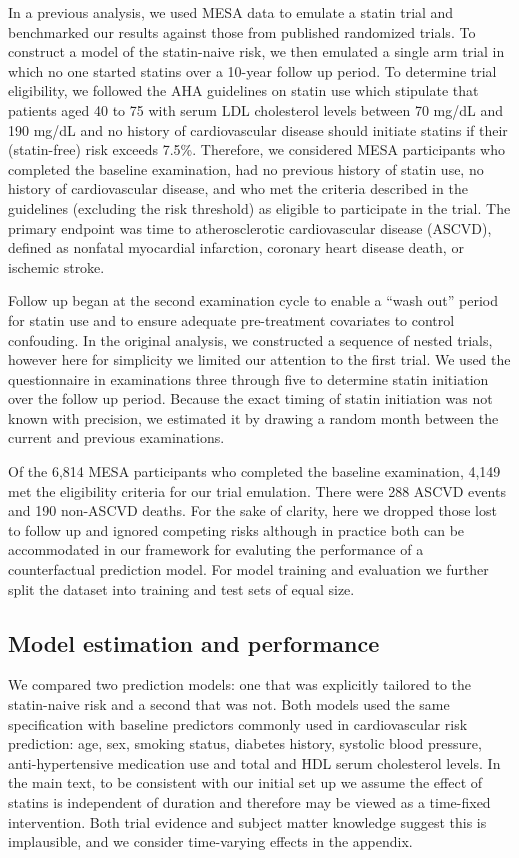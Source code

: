 In a previous analysis, we used MESA data to emulate a statin trial and benchmarked our results against those from published randomized trials. To construct a model of the statin-naive risk, we then emulated a single arm trial in which no one started statins over a 10-year follow up period. To determine trial eligibility, we followed the AHA guidelines \cite{grundy_scott_m_2018_2019} on statin use which stipulate that patients aged 40 to 75 with serum LDL cholesterol levels between 70 mg/dL and 190 mg/dL and no history of cardiovascular disease should initiate statins if their (statin-free) risk exceeds 7.5\%. Therefore, we considered MESA participants who completed the baseline examination, had no previous history of statin use, no history of cardiovascular disease, and who met the criteria described in the guidelines (excluding the risk threshold) as eligible to participate in the trial. The primary endpoint was time to atherosclerotic cardiovascular disease (ASCVD), defined as nonfatal myocardial infarction, coronary heart disease death, or ischemic stroke. 

Follow up began at the second examination cycle to enable a ``wash out'' period for statin use and to ensure adequate pre-treatment covariates to control confouding. In the original analysis, we constructed a sequence of nested trials, however here for simplicity we limited our attention to the first trial. We used the questionnaire in examinations three through five to determine statin initiation over the follow up period. Because the exact timing of statin initiation was not known with precision, we estimated it by drawing a random month between the current and previous examinations. 

Of the 6,814 MESA participants who completed the baseline examination, 4,149 met the eligibility criteria for our trial emulation. There were 288 ASCVD events and 190 non-ASCVD deaths. For the sake of clarity, here we dropped those lost to follow up and ignored competing risks although in practice both can be accommodated in our framework for evaluting the performance of a counterfactual prediction model. For model training and evaluation we further split the dataset into training and test sets of equal size. 

\subsection{Model estimation and performance}
We compared two prediction models: one that was explicitly tailored to the statin-naive risk and a second that was not. Both models used the same specification with baseline predictors commonly used in cardiovascular risk prediction: age, sex, smoking status, diabetes history, systolic blood pressure, anti-hypertensive medication use and total and HDL serum cholesterol levels. In the main text, to be consistent with our initial set up we assume the effect of statins is independent of duration and therefore may be viewed as a time-fixed intervention. Both trial evidence and subject matter knowledge suggest this is implausible, and we consider time-varying effects in the appendix.

